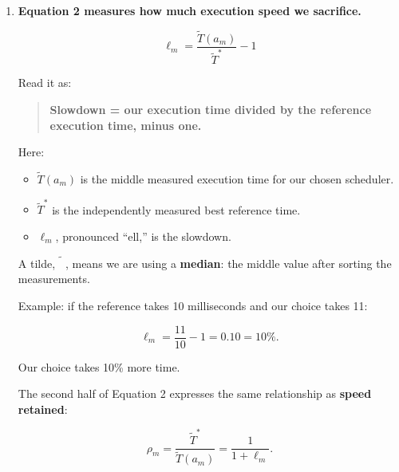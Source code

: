 \documentclass[11pt,a4paper]{article}
\providecommand{\tightlist}{\setlength{\itemsep}{0pt}\setlength{\parskip}{3pt}}
\begin{document}
\begin{enumerate}
  The total charged to one job is:

  \[
  0.06+0.03+0.20=0.29\text{ seconds}.
  \]

  When the paper reports results with an \textbf{``available'' or ``cached'' prior}, it sets aside the already-paid training expense for that comparison. It then examines how much reuse would justify paying that expense.

  The same equation also works for \textbf{CPU time}.

  \textbf{Wall time} is stopwatch time. \textbf{CPU time} adds processor time across the program's threads. Four threads each consuming one CPU second can produce roughly four CPU seconds during roughly one elapsed second.

  CPU seconds are not electricity measurements.
\item
  \textbf{Equation 2 measures how much execution speed we sacrifice.}

  \[
  \ell_m
  =
  \frac{\widetilde T(a_m)}{\widetilde T^*}-1
  \]

  Read it as:

  \begin{quote}
  \textbf{Slowdown = our execution time divided by the reference execution time, minus one.}
  \end{quote}

  Here:

  \begin{itemize}
  \tightlist
  \item
    \(\widetilde T(a_m)\) is the middle measured execution time for our chosen scheduler.
  \item
    \(\widetilde T^*\) is the independently measured best reference time.
  \item
    \(\ell_m\), pronounced ``ell,'' is the slowdown.
  \end{itemize}

  A tilde, \(\widetilde{\phantom T}\), means we are using a \textbf{median}: the middle value after sorting the measurements.

  Example: if the reference takes 10 milliseconds and our choice takes 11:

  \[
  \ell_m=\frac{11}{10}-1=0.10=10\%.
  \]

  Our choice takes 10\% more time.

  The second half of Equation 2 expresses the same relationship as \textbf{speed retained}:

  \[
  \rho_m
  =
  \frac{\widetilde T^*}{\widetilde T(a_m)}
  =
  \frac{1}{1+\ell_m}.
  \]


\end{enumerate}
\end{document}
